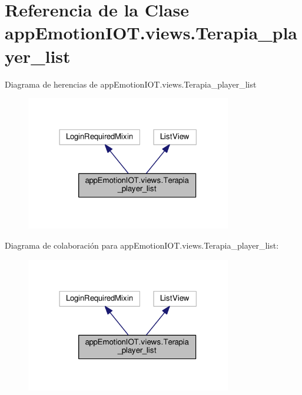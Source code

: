 \hypertarget{classappEmotionIOT_1_1views_1_1Terapia__player__list}{}\section{Referencia de la Clase app\+Emotion\+I\+O\+T.\+views.\+Terapia\+\_\+player\+\_\+list}
\label{classappEmotionIOT_1_1views_1_1Terapia__player__list}


Diagrama de herencias de app\+Emotion\+I\+O\+T.\+views.\+Terapia\+\_\+player\+\_\+list
\nopagebreak
\begin{figure}[H]
\begin{center}
\leavevmode
\includegraphics[width=254pt]{classappEmotionIOT_1_1views_1_1Terapia__player__list__inherit__graph}
\end{center}
\end{figure}


Diagrama de colaboración para app\+Emotion\+I\+O\+T.\+views.\+Terapia\+\_\+player\+\_\+list\+:
\nopagebreak
\begin{figure}[H]
\begin{center}
\leavevmode
\includegraphics[width=254pt]{classappEmotionIOT_1_1views_1_1Terapia__player__list__coll__graph}
\end{center}
\end{figure}
